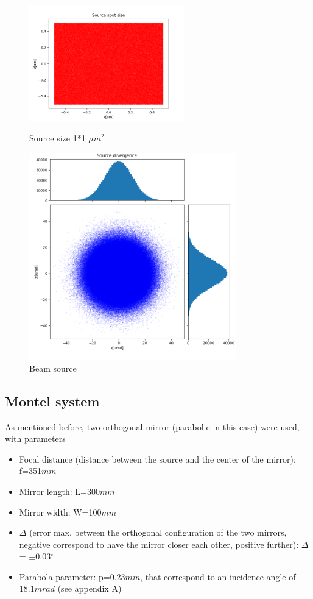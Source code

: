 \documentclass[a4paper]{article}
\begin{document}
\begin{figure}[H]
\centering
\includegraphics[width=0.6\textwidth]{Spot.png}
\caption{\label{fig:beam at the source}Source size 1*1 $\mu $$m^2$ }
\includegraphics[width=0.8\textwidth]{Initial_divergence.png}
\caption{\label{fig:source divergence} Beam source}
\end{figure}


\subsection{Montel system}

As mentioned before, two orthogonal mirror (parabolic in this case) were used, with parameters
\begin{itemize}
\item Focal distance (distance between the source and the center of the mirror): f=351$mm$
\item Mirror length: L=300$mm$
\item Mirror width:  W=100$mm$
\item $\Delta$ (error max. between the orthogonal configuration of the two mirrors, negative correspond to have the mirror closer each other, positive further):      $\Delta$ = $\pm$0.03$^{\circ}$
\item Parabola parameter: p=0.23$mm$, that correspond to an incidence angle of 18.1$mrad$ (see appendix A)
\end{itemize}
\end{document}
